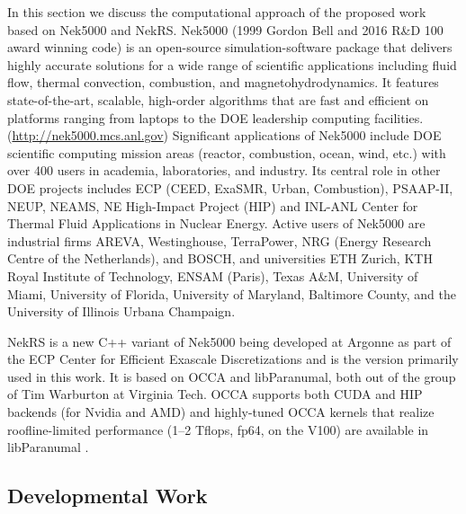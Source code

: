 In this section we discuss the computational approach of the proposed work based on Nek5000 and NekRS.
%
Nek5000 (1999 Gordon Bell and 2016 R\&D 100 award winning code) is an
open-source simulation-software package that delivers highly accurate solutions
for a wide range of scientific applications including fluid flow, thermal
convection, combustion, and magnetohydrodynamics. It features state-of-the-art,
scalable, high-order algorithms that are fast and efficient on platforms
ranging from laptops to the DOE leadership computing facilities.
({\footnotesize\url{http://nek5000.mcs.anl.gov}})
   Significant applications of Nek5000 include DOE scientific
computing mission areas (reactor, combustion, ocean, wind, etc.) with over 400
users in academia, laboratories, and industry. Its central role in other DOE
projects includes  ECP (CEED, ExaSMR, Urban, Combustion), PSAAP-II, NEUP, NEAMS, NE
High-Impact Project (HIP) and  INL-ANL Center for Thermal Fluid Applications in
Nuclear Energy.
   Active users of Nek5000 are industrial firms AREVA, Westinghouse,
TerraPower, NRG (Energy Research Centre of the Netherlands), and BOSCH, and
universities ETH Zurich, KTH Royal Institute of Technology, ENSAM (Paris),
Texas A\&M, University of Miami, University of Florida, University of Maryland,
Baltimore County, and the University of Illinois Urbana Champaign.

NekRS is a new C++ variant of Nek5000 being developed at Argonne as part of the
ECP Center for Efficient Exascale Discretizations and is the version primarily
used in this work.  It is based
on OCCA and libParanumal, both out of the group of Tim Warburton at
Virginia Tech.  OCCA supports both CUDA and HIP backends (for Nvidia and AMD)
and highly-tuned OCCA kernels that realize roofline-limited performance
(1--2 Tflops, fp64, on the V100) are available in libParanumal \cite{fischer20a}.



\vspace{-.25in}
\subsection{Developmental Work}
\vspace{-.2in}



